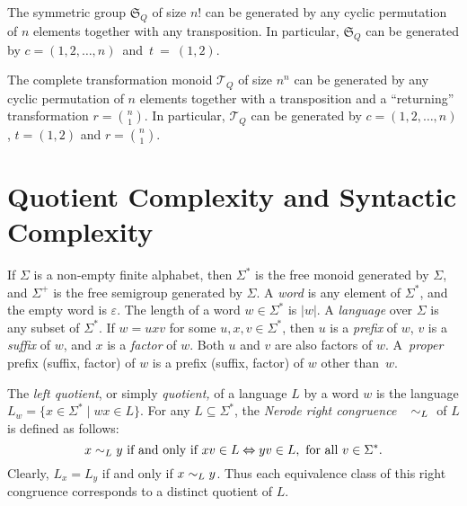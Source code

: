 \documentclass{llncs}
\newcommand{\eps}{\varepsilon}
\newcommand{\Sig}{\Sigma}
\newcommand{\cT}{{\mathcal T}}
\newcommand{\raL}{{\hspace{.1cm}{\sim_L} \hspace{.1cm}}}
\begin{document}
\begin{theorem}
\label{thm:piccard}
The symmetric group $\mathfrak{S}_Q$ of size $n!$ can be generated by any cyclic
permutation of $n$ elements together with any transposition. In particular, $\mathfrak{S}_Q$ can be generated by
$c=(1,2,\ldots, n)$~and~$t~=~(1,2)$.
\end{theorem}

\begin{theorem}
\label{thm:salomaa}
The complete transformation monoid $\cT_Q$ of size $n^n$ can be generated by any cyclic
permutation of $n$ elements together with a transposition and a ``returning'' transformation $r={n \choose 1}$. In particular, $\cT_Q$ can be generated by $c=(1,2,\ldots, n)$,  $t=(1,2)$ and $r={n \choose 1}$.
\end{theorem}


\section{Quotient Complexity and Syntactic Complexity}\label{sec:complexity} 

If $\Sig$ is a non-empty finite alphabet, then $\Sig^*$ is the free monoid generated by $\Sig$, and $\Sig^+$ is the free semigroup generated by $\Sig$.  A \emph{word} is any element of $\Sig^*$, and the empty word is $\eps$. The length of a word $w\in \Sig^*$ is $|w|$. A \emph{language} over $\Sig$ is any subset of $\Sig^*$. 
If $w=uxv$ for some $u,x,v\in\Sigma^*$, then $u$ is a {\em prefix\/} of $w$, $v$ is a {\em suffix\/} of $w$, and $x$ is a {\em factor\/} of $w$. Both $u$ and $v$ are also factors of $w$. 
A~{\em proper} prefix (suffix, factor) of $w$ is a prefix (suffix, factor) of $w$ other than~$w$. 


The \emph{left quotient}, or simply \emph{quotient,} of a language $L$ by a word $w$ is  the language $L_w=\{x\in \Sig^*\mid wx\in L \}$. 
For any  $L\subseteq \Sig^*$, the \emph{Nerode right congruence}~\cite{Ner58} $\raL$ of $L$ is defined as follows: 
\begin{equation*}
x \raL y \mbox{ if and only if } xv\in L  \Leftrightarrow yv\in L, \mbox { for all } v\in\Sig^*.
\end{equation*}
Clearly, $L_x=L_y$ if and only if $x\raL y$.
Thus each equivalence class of this right congruence corresponds to a distinct quotient of $L$.
\end{document}
